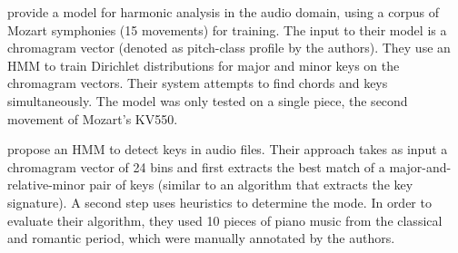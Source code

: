 \textcite{burgoyne2005learning} provide a model for harmonic
analysis in the audio domain, using a corpus of Mozart
symphonies (15 movements) for training. The input to their
model is a chromagram vector (denoted as pitch-class profile
by the authors). They use an HMM to train Dirichlet
distributions for major and minor keys on the chromagram
vectors. Their system attempts to find chords and keys
simultaneously. The model was only tested on a single piece,
the second movement of Mozart's KV550.

\textcite{chai2005detection} propose an HMM to detect keys
in audio files. Their approach takes as input a chromagram
vector of 24 bins and first extracts the best match of a
major-and-relative-minor pair of keys (similar to an
algorithm that extracts the key signature). A second step
uses heuristics to determine the mode. In order to evaluate
their algorithm, they used 10 pieces of piano music from the
classical and romantic period, which were manually annotated
by the authors.



